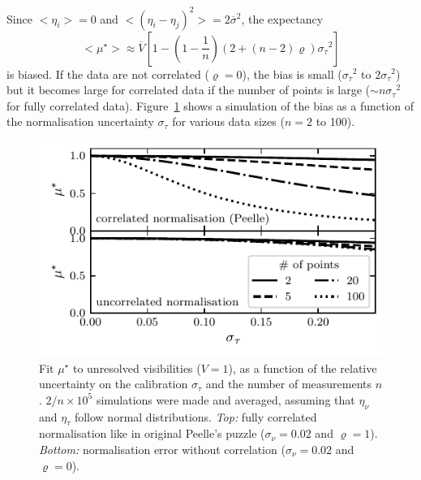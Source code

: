 \documentclass[twocolumn]{article}
\def\expect#1{\ensuremath{ {<#1>} }}
\def\ppp#1{#1^\star}
\def\norm{_\tau}
\def\meas{_\nu}
\def\mean#1{\overline{#1}}
\def\data{\ensuremath{{\scriptstyle V}}}
\def\datamean{\ensuremath{\mean\data}}
\def\mod{\ensuremath{\mu}}
\def\error{\ensuremath{\eta}}
\def\relerror{\ensuremath{\error\norm}}
\def\abserror{\ensuremath{\error\meas}}
\def\dev{\ensuremath{\sigma}}
\def\devmean{\ensuremath{\mean\dev}}
\def\reldev{\ensuremath{\dev\norm}}
\def\absdev{\ensuremath{\dev\meas}}
\def\corr{\ensuremath{\varrho}}
\def\datappp{\ppp{\mod}}
\begin{document}
Since $\expect{\error_i} = 0$ and $\expect{(\error_i-\error_j)^2} = 2\devmean^2$, the expectancy
\begin{equation}
    \expect{\ppp{\mod}} \approx \datamean 
            \left[ 1 -  
             \left(1-\frac1n\right)
             \left(2 + (n-2)\corr\right)
              \reldev^2 \right]
\end{equation}
is biased.  If the data are not correlated ($\corr = 0$), the bias is small
($\reldev^2$ to $2\reldev^2$) but it becomes large for correlated data if the number of points is large ($\sim n\reldev^2$ for fully correlated data).
Figure~\ref{fig:uncorr-peelle} shows a simulation of the bias as a function of
the normalisation uncertainty $\reldev$ for various data sizes ($n = 2$ to
100). 
\begin{figure}[t]
\centering
\includegraphics[width=\linewidth]{pdf/uncorrelated-peelle.pdf}
\caption{Fit $\datappp$  to unresolved visibilities ($\data = 1$), as a function of the relative uncertainty on the calibration $\reldev$ and the number of measurements $n$. $2/n\times10^5$ simulations were made and averaged, assuming that $\abserror$ and $\relerror$ follow normal distributions. \textit{Top:} fully correlated normalisation like in original Peelle's puzzle ($\absdev=0.02$ and $\corr = 1$). \textit{Bottom:} normalisation error without correlation ($\absdev=0.02$ and $\corr = 0$).}
\label{fig:uncorr-peelle}
\end{figure}
\end{document}
